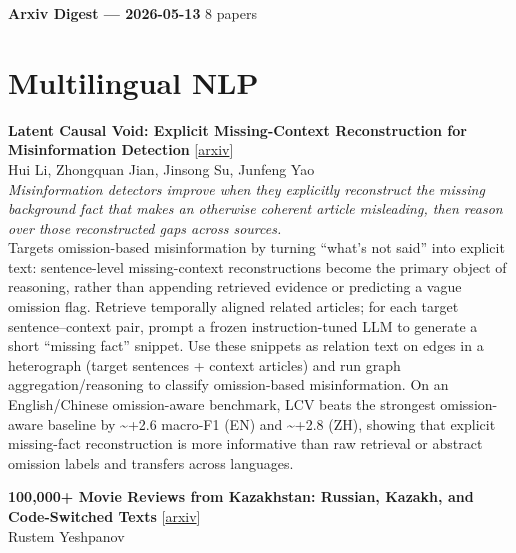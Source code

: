 \documentclass[12pt,letterpaper]{article}
\begin{document}
{\footnotesize\textbf{Arxiv Digest --- 2026-05-13} \hfill 8 papers}

\smallskip

\section*{Multilingual NLP}

{\small\textbf{Latent Causal Void: Explicit Missing-Context Reconstruction for Misinformation Detection}} {\scriptsize[\href{https://arxiv.org/abs/2605.12156}{arxiv}]}\\
{\scriptsize Hui Li, Zhongquan Jian, Jinsong Su, Junfeng Yao}\\

{\small\textit{Misinformation detectors improve when they explicitly reconstruct the missing background fact that makes an otherwise coherent article misleading, then reason over those reconstructed gaps across sources.}}\\[1pt]
{\footnotesize Targets omission-based misinformation by turning ``what's not said'' into explicit text: sentence-level missing-context reconstructions become the primary object of reasoning, rather than appending retrieved evidence or predicting a vague omission flag. Retrieve temporally aligned related articles; for each target sentence--context pair, prompt a frozen instruction-tuned LLM to generate a short ``missing fact'' snippet. Use these snippets as relation text on edges in a heterograph (target sentences + context articles) and run graph aggregation/reasoning to classify omission-based misinformation. On an English/Chinese omission-aware benchmark, LCV beats the strongest omission-aware baseline by \textasciitilde{}+2.6 macro-F1 (EN) and \textasciitilde{}+2.8 (ZH), showing that explicit missing-fact reconstruction is more informative than raw retrieval or abstract omission labels and transfers across languages.}

\medskip

{\small\textbf{100,000+ Movie Reviews from Kazakhstan: Russian, Kazakh, and Code-Switched Texts}} {\scriptsize[\href{https://arxiv.org/abs/2605.08600}{arxiv}]}\\
{\scriptsize Rustem Yeshpanov}\\
\end{document}
